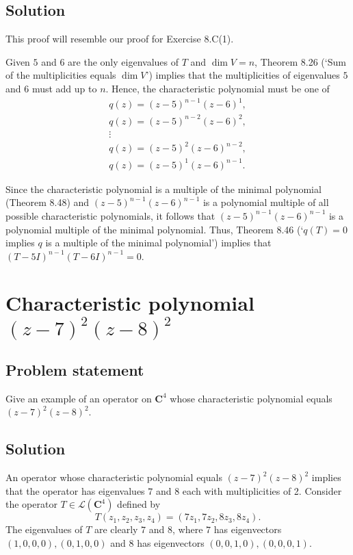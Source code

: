 \documentclass{article}
\begin{document}
\subsection*{Solution}
This proof will resemble our proof for Exercise 8.C(1). 

Given $5$ and $6$ are the only eigenvalues of $T$ and $\operatorname{dim}V=n$, Theorem 8.26 (`Sum of the multiplicities equals $\operatorname{dim}V$') implies that the multiplicities of eigenvalues $5$ and $6$ must add up to $n$. 
Hence, the characteristic polynomial must be one of 
\begin{gather*} 
    q(z)=(z-5)^{n-1}(z-6)^1,\\
    q(z)=(z-5)^{n-2}(z-6)^2,\\
    \vdots\\
    q(z)=(z-5)^{2}(z-6)^{n-2},\\
    q(z)=(z-5)^{1}(z-6)^{n-1}.
\end{gather*}

Since the characteristic polynomial is a multiple of the minimal polynomial (Theorem 8.48) and $(z-5)^{n-1}(z-6)^{n-1}$ is a polynomial multiple of all possible characteristic polynomials, it follows that $(z-5)^{n-1}(z-6)^{n-1}$ is a polynomial multiple of the minimal polynomial. 
Thus, Theorem 8.46 (`$q(T)=0$ implies $q$ is a multiple of the minimal polynomial') implies that $(T-5I)^{n-1}(T-6I)^{n-1}=0$.

\clearpage

\section{Characteristic polynomial $(z-7)^2(z-8)^2$}
\subsection*{Problem statement}
Give an example of an operator on $\mathbf{C}^4$ whose characteristic polynomial equals $(z-7)^2(z-8)^2$.

\subsection*{Solution}
An operator whose characteristic polynomial equals $(z-7)^2(z-8)^2$ implies that the operator has eigenvalues $7$ and $8$ each with multiplicities of 2. 
Consider the operator $T\in\mathcal{L}(\mathbf{C}^4)$ defined by
\[T(z_1,z_2,z_3,z_4)=(7z_1,7z_2,8z_3,8z_4).\]
The eigenvalues of $T$ are clearly $7$ and $8$, where $7$ has eigenvectors $(1,0,0,0),(0,1,0,0)$ and $8$ has eigenvectors $(0,0,1,0),(0,0,0,1)$. 
\end{document}
